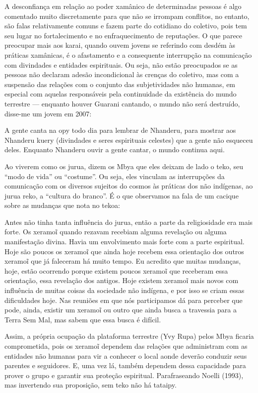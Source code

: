 A desconfiança em relação ao poder xamânico de determinadas pessoas é
algo comentado muito discretamente para que não se irrompam conflitos,
no entanto, são falas relativamente comuns e fazem parte do cotidiano
do coletivo, pois tem seu lugar no fortalecimento e no enfraquecimento
de reputações. O que parece preocupar mais aos karai, quando ouvem
jovens se referindo com desdém às práticas xamânicas, é o afastamento e
a consequente interrupção na comunicação com divindades e entidades
espirituais. Ou seja, não estão preocupados se as pessoas não declaram
adesão incondicional às crenças do coletivo, mas com a suspensão das
relações com o conjunto das subjetividades não humanas, em especial com
aquelas responsáveis pela continuidade da existência do mundo terrestre
--- enquanto houver Guarani cantando, o mundo não será destruído,
disse-me um jovem em 2007: 

A gente canta na opy todo dia para lembrar de Nhanderu, para mostrar aos
Nhanderu kuery (divindades e seres espirituais celestes) que a gente
não esqueceu deles. Enquanto Nhanderu ouvir a gente cantar, o mundo
continua aqui.

Ao viverem como os jurua, dizem os Mbya que eles deixam de lado o teko,
seu ``modo de vida'' ou ``costume''. Ou seja, eles vinculam as interrupções
da comunicação com os diversos sujeitos do cosmos às práticas dos não
indígenas, ao jurua reko, a ``cultura do branco''. É o que observamos na
fala de um cacique sobre as mudanças que nota no tekoa:

Antes não tinha tanta influência do jurua, então a parte da
religiosidade era mais forte. Os xeramo\~{i} quando
rezavam recebiam alguma revelação ou alguma manifestação divina. Havia
um envolvimento mais forte com a parte espiritual. Hoje são poucos os
xeramo\~{i} que ainda hoje recebem essa orientação
dos outros xeramo\~{i} que já faleceram há muito
tempo. Eu acredito que muitas mudanças, hoje, estão ocorrendo porque
existem poucos xeramo\~{i} que receberam essa
orientação, essa revelação dos antigos. Hoje existem
xeramo\~{i} mais novos com influência de muitas
coisas da sociedade não indígena, e por isso se criam essas
dificuldades hoje. Nas reuniões em que nós participamos dá para perceber
que pode, ainda, existir um xeramo\~{i} ou outro que
ainda busca a travessia para a Terra Sem Mal, mas sabem que essa busca
é difícil. 

Assim, a própria ocupação da plataforma terrestre (Yvy Rupa) pelos Mbya
ficaria comprometida, pois os xeramo\~{i} dependem
das relações que administram com as entidades não humanas para vir a
conhecer o local aonde deverão conduzir seus parentes e seguidores. E,
uma vez lá, também dependem dessa capacidade para prover o grupo e
garantir sua proteção espiritual. Parafraseando Noelli (1993), mas
invertendo sua proposição, sem teko não há tataipy.

